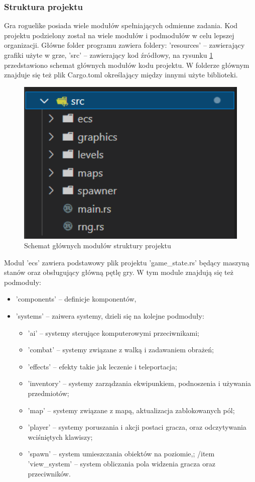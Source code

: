 \documentclass[12pt,twoside]{article}
\begin{document}
\subsubsection{Struktura projektu}
Gra roguelike posiada wiele modułów spełniających odmienne zadania. Kod projektu podzielony został na wiele modułów i podmodułów w celu lepszej organizacji. Główne folder programu zawiera foldery: 'resources' -- zawierający grafiki użyte w grze, 'src' -- zawierający kod źródłowy, na rysunku \ref{code:main_structure} przedstawiono schemat głównych modułów kodu projektu. W folderze głównym znajduje się też plik Cargo.toml określający między innymi użyte biblioteki.

\begin{figure}[h]
	\centering
	\includegraphics[width=12cm]{images/code/main_structure.png}
	\caption{Schemat głównych modułów struktury projektu}
	\label{code:main_structure}
\end{figure}
\FloatBarrier

Moduł 'ecs' zawiera podstawowy plik projektu 'game\_state.rs' będący maszyną stanów oraz obsługujący główną pętlę gry. W tym module znajdują się też podmoduły:
 
 \begin{itemize}
 	\item 'components' -- definicje komponentów,
 	\item 'systems' -- zaiwera systemy, dzieli się na kolejne podmoduły: 
 	\begin{itemize}
 		\item 'ai' -- systemy sterujące komputerowymi przeciwnikami;
 		\item 'combat' -- systemy związane z walką i zadawaniem obrażeń;
 		\item 'effects' -- efekty takie jak leczenie i teleportacja;
 		\item 'inventory' -- systemy zarządzania ekwipunkiem, podnoszenia i używania przedmiotów;
 		\item 'map' -- systemy związane z mapą, aktualizacja zablokowanych pól;
 		\item 'player' -- systemy poruszania i akcji postaci gracza, oraz odczytywania wciśniętych klawiszy;
 		\item 'spawn' -- system umieszczania obiektów na poziomie,;
 		/item 'view\_system' -- system obliczania pola widzenia gracza oraz przeciwników.
 	\end{itemize}
 \end{itemize}
 
\end{document}
